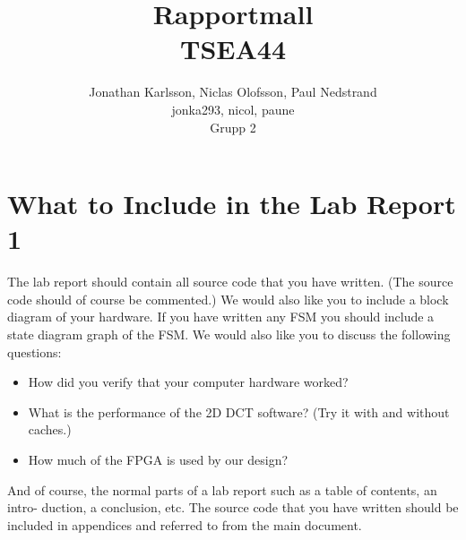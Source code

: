 \documentclass[a4paper]{article}
\author{Jonathan Karlsson, Niclas Olofsson, Paul Nedstrand\\jonka293, nicol, paune\\Grupp 2}
\title{Rapportmall\\ \vspace{2 mm} {\large TSEA44}}
\begin{document}
\maketitle

\section{What to Include in the Lab Report 1}

The lab report should contain all source code that you have written. (The source code should of course be commented.) We would also like you to include a block diagram of your hardware. If you have written any FSM you should include a state diagram graph of the FSM.
We would also like you to discuss the following questions:
\begin{itemize}
\item  How did you verify that your computer hardware worked?
\item  What is the performance of the 2D DCT software? (Try it with and without caches.)
\item How much of the FPGA is used by our design?
\end{itemize}
And of course, the normal parts of a lab report such as a table of contents, an intro- duction, a conclusion, etc. The source code that you have written should be included in appendices and referred to from the main document.
\end{document}
